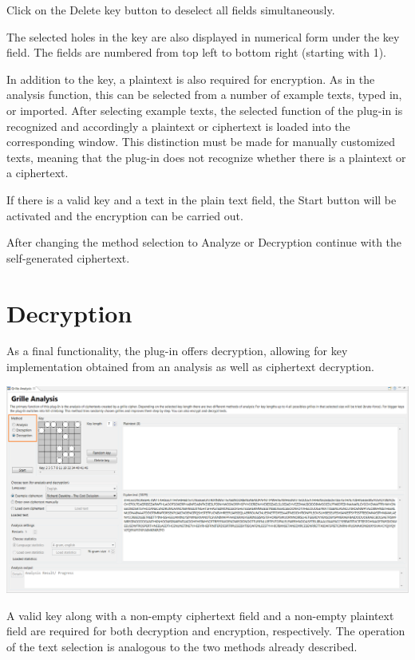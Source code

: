 \documentclass[fontsize=12pt, DIV=15, parskip=half-]{scrartcl}
\theoremstyle{break}
\begin{document}
Click on the \glqq Delete key\grqq{} button to deselect all fields simultaneously.

The selected holes in the key are also displayed in numerical form under the key field. The fields are numbered from top left to bottom right (starting with 1).

In addition to the key, a plaintext is also required for encryption. As in the analysis function, this can be selected from a number of example texts, typed in, or imported. After selecting example texts, the selected function of the plug-in is recognized and accordingly a plaintext or ciphertext is loaded into the corresponding window. This distinction must be made for manually customized texts, meaning that the plug-in does not recognize whether there is a plaintext or a ciphertext.

If there is a valid key and a text in the plain text field, the \glqq Start\grqq{} button will be activated and the encryption can be carried out.

After changing the method selection to \glqq Analyze\grqq{} or \glqq Decryption\grqq{} continue with the self-generated ciphertext.


\section{Decryption}\hypertarget{entschl}{}

As a final functionality, the plug-in offers decryption, allowing for key implementation obtained from an analysis as well as ciphertext decryption.
 

\includegraphics[scale=0.45]{enFleissnerDecrypt.png}

A valid key along with a non-empty ciphertext field and a non-empty plaintext field are required for both decryption and encryption, respectively. The operation of the text selection is analogous to the two methods already described.
\end{document}
